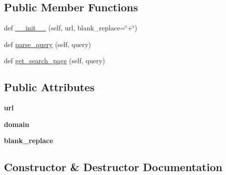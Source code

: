 \subsection*{Public Member Functions}
\begin{DoxyCompactItemize}
\item 
def \hyperlink{classhal_1_1internet_1_1engines_1_1_search_engine_afa48d729c2ecd0ba30a56544dd3951ea}{\+\_\+\+\_\+init\+\_\+\+\_\+} (self, url, blank\+\_\+replace=\char`\"{}+\char`\"{})
\item 
def \hyperlink{classhal_1_1internet_1_1engines_1_1_search_engine_afde9fa1646b6057ecd94746132c9b7c1}{parse\+\_\+query} (self, query)
\item 
def \hyperlink{classhal_1_1internet_1_1engines_1_1_search_engine_a0da195cc7ff5bf796127827b8c54c2ef}{get\+\_\+search\+\_\+page} (self, query)
\end{DoxyCompactItemize}
\subsection*{Public Attributes}
\begin{DoxyCompactItemize}
\item 
{\bfseries url}\hypertarget{classhal_1_1internet_1_1engines_1_1_search_engine_a2b16e6f92de3d9dd64d1c51efbd8717d}{}\label{classhal_1_1internet_1_1engines_1_1_search_engine_a2b16e6f92de3d9dd64d1c51efbd8717d}

\item 
{\bfseries domain}\hypertarget{classhal_1_1internet_1_1engines_1_1_search_engine_a96f97387f7a035a12cb1509288b5401a}{}\label{classhal_1_1internet_1_1engines_1_1_search_engine_a96f97387f7a035a12cb1509288b5401a}

\item 
{\bfseries blank\+\_\+replace}\hypertarget{classhal_1_1internet_1_1engines_1_1_search_engine_a28184626d85a0e6a0af8f3a2e381cf7f}{}\label{classhal_1_1internet_1_1engines_1_1_search_engine_a28184626d85a0e6a0af8f3a2e381cf7f}

\end{DoxyCompactItemize}


\subsection{Constructor \& Destructor Documentation}
